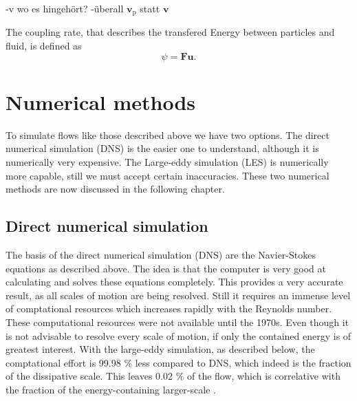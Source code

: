 \documentclass[a4paper,12pt]{article}
\renewcommand*\vec[1]{\boldsymbol{#1}}
\numberwithin{equation}{section} %
\begin{document}
 
-$\mathrm{v}$ wo es hingehört?
-überall $\vec{v}_\mathrm{p}$ statt $\vec{v}$

The coupling rate, that describes the transfered Energy between particles and fluid, is defined as
\begin{equation}
\psi = \vec{F} \vec{u}. 
\end{equation}

 
 \pagebreak
\section{Numerical methods} %
To simulate flows like those described above we have two options. The direct numerical simulation (DNS) is the easier one to understand, although it is numerically very expensive. The Large-eddy simulation (LES) is numerically more capable, still we must accept certain inaccuracies. These two numerical methods are now discussed in the following chapter.
\subsection{Direct numerical simulation}
The basis of the direct numerical simulation (DNS) are the Navier-Stokes equations as described above. The idea is that the computer is very good at calculating and solves these equations completely. This provides a very accurate result, as all scales of motion are being resolved. Still it requires an immense level of comptational resources which increases rapidly with the Reynolds number. These computational resources were not available until the 1970s. Even though it is not advisable to resolve every scale of motion, if only the contained energy is of greatest interest. With the large-eddy simulation, as described below, the comptational effort is 99.98 \% less compared to DNS, which indeed is the fraction of the dissipative scale. This leaves 0.02 \% of the flow, which is correlative with the fraction of the energy-containing larger-scale \cite{turbulentFlows}.%
\end{document}

